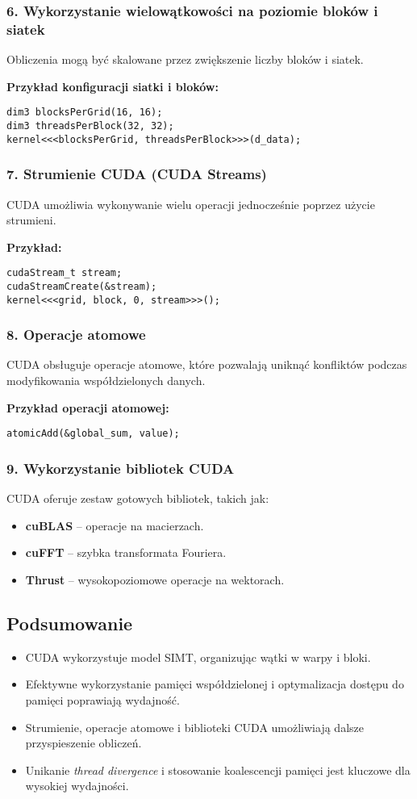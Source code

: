 \subsubsection{6. Wykorzystanie wielowątkowości na poziomie bloków i siatek}
Obliczenia mogą być skalowane przez zwiększenie liczby bloków i siatek.

\textbf{Przykład konfiguracji siatki i bloków:}
\begin{verbatim}
dim3 blocksPerGrid(16, 16);
dim3 threadsPerBlock(32, 32);
kernel<<<blocksPerGrid, threadsPerBlock>>>(d_data);
\end{verbatim}

\subsubsection{7. Strumienie CUDA (CUDA Streams)}
CUDA umożliwia wykonywanie wielu operacji jednocześnie poprzez użycie strumieni.

\textbf{Przykład:}
\begin{verbatim}
cudaStream_t stream;
cudaStreamCreate(&stream);
kernel<<<grid, block, 0, stream>>>();
\end{verbatim}

\subsubsection{8. Operacje atomowe}
CUDA obsługuje operacje atomowe, które pozwalają uniknąć konfliktów podczas modyfikowania współdzielonych danych.

\textbf{Przykład operacji atomowej:}
\begin{verbatim}
atomicAdd(&global_sum, value);
\end{verbatim}

\subsubsection{9. Wykorzystanie bibliotek CUDA}
CUDA oferuje zestaw gotowych bibliotek, takich jak:
\begin{itemize}
    \item \textbf{cuBLAS} – operacje na macierzach.
    \item \textbf{cuFFT} – szybka transformata Fouriera.
    \item \textbf{Thrust} – wysokopoziomowe operacje na wektorach.
\end{itemize}

\subsection{Podsumowanie}
\begin{itemize}
    \item CUDA wykorzystuje model SIMT, organizując wątki w warpy i bloki.
    \item Efektywne wykorzystanie pamięci współdzielonej i optymalizacja dostępu do pamięci poprawiają wydajność.
    \item Strumienie, operacje atomowe i biblioteki CUDA umożliwiają dalsze przyspieszenie obliczeń.
    \item Unikanie \textit{thread divergence} i stosowanie koalescencji pamięci jest kluczowe dla wysokiej wydajności.
\end{itemize}
